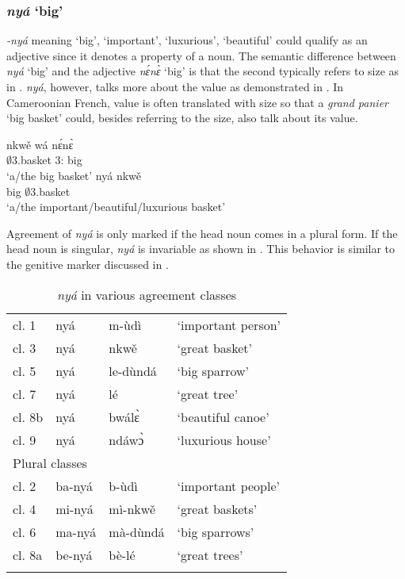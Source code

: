 \subsubsection{{\itshape nyá} `big'}
\label{sec:nya}


{\itshape -nyá} meaning `big', `important', `luxurious',  `beautiful'  could qualify as an adjective since it denotes a property of a noun. The semantic difference between {\itshape nyá} `big' and the adjective {\itshape nɛ́nɛ̀} `big' is that the second typically refers to size as in . {\itshape nyá}, however, talks more about the value as demonstrated in . In Cameroonian French, value is often translated with size so that a {\itshape grand panier} `big basket' could, besides referring to the size, also talk about its value.

\ea \label{nya}
  \ea \label{nya1}
 \gll  nkwě wá nɛ́nɛ̀\\
          $\emptyset$3.basket 3:{\ATT} big \\
    \trans `a/the big basket'
\ex \label{nya2}
  \gll   nyá nkwě \\
             big $\emptyset$3.basket \\
    \trans `a/the important/beautiful/luxurious basket'
\z
\z



Agreement of {\itshape nyá}  is only marked if the head noun comes in a plural form. If the head noun is singular, {\itshape nyá} is invariable as shown in . This behavior is similar to the genitive marker discussed in .

\begin{table}
\begin{tabular}{ll ll}
 \lsptoprule
\multicolumn{4}{l}{Singular classes} \\
 \midrule
cl. 1 & nyá & m-ùdì & `important person'  \\
cl. 3 & nyá & nkwě  & `great basket'        \\
cl. 5 & nyá & le-dùndá & `big sparrow'      \\
cl. 7 & nyá & lé       & `great tree'            \\
cl. 8b & nyá & bwálɛ̀ & `beautiful canoe'  \\
cl. 9 & nyá &   ndáwɔ̀ & `luxurious house'   \\
 \midrule
\multicolumn{4}{l}{Plural classes} \\
 \midrule
cl. 2 & ba-nyá & b-ùdì & `important people' \\
cl. 4 & mi-nyá & mì-nkwě & `great baskets'  \\
cl. 6 & ma-nyá & mà-dùndá & `big sparrows' \\
cl. 8a & be-nyá & bè-lé & `great trees' \\
 \lspbottomrule
\end{tabular}
\caption{{\itshape nyá} in various agreement classes}
\label{Tab:nya}
\end{table}

